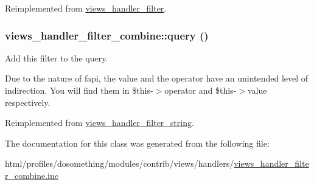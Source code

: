 Reimplemented from \hyperlink{classviews__handler__filter_af14c69367162057a32709a6340de0988}{views\_\-handler\_\-filter}.\hypertarget{classviews__handler__filter__combine_adcae1e0d8c9349fdc10c000bb62f0b50}{
\subsubsection[{query}]{\setlength{\rightskip}{0pt plus 5cm}views\_\-handler\_\-filter\_\-combine::query ()}}
\label{classviews__handler__filter__combine_adcae1e0d8c9349fdc10c000bb62f0b50}
Add this filter to the query.

Due to the nature of fapi, the value and the operator have an unintended level of indirection. You will find them in \$this-\/$>$operator and \$this-\/$>$value respectively. 

Reimplemented from \hyperlink{classviews__handler__filter__string_afcfdae379583a2eb912e1b82d4513503}{views\_\-handler\_\-filter\_\-string}.

The documentation for this class was generated from the following file:\begin{DoxyCompactItemize}
\item 
html/profiles/dosomething/modules/contrib/views/handlers/\hyperlink{views__handler__filter__combine_8inc}{views\_\-handler\_\-filter\_\-combine.inc}\end{DoxyCompactItemize}
